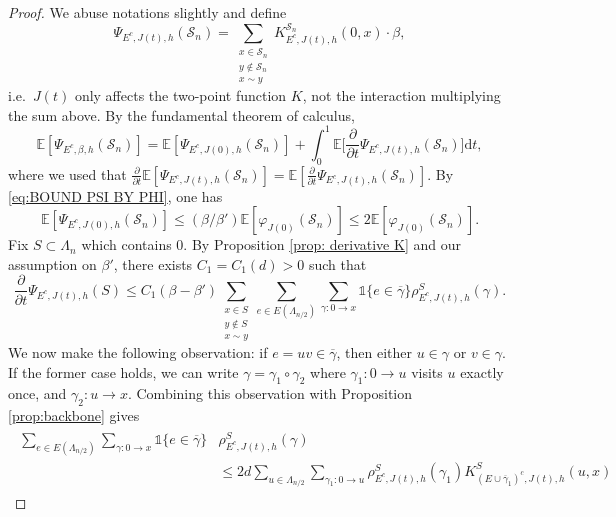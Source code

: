 \documentclass[10pt,a4paper]{amsart}
\numberwithin{equation}{section}
\begin{document}
\begin{proof} We abuse notations slightly and define
\begin{equation}
\Psi_{E^c,J(t),h}(\mathcal S_n)=\sum_{\substack{x\in \mathcal S_n\\y\notin \mathcal S_n\\x\sim y}}K_{E^c,J(t),h}^{\mathcal S_n}(0,x)\cdot \beta,
\end{equation}
i.e.~$J(t)$ only affects the two-point function $K$, not the interaction multiplying the sum above.
By the fundamental theorem of calculus, 
\begin{equation}\label{eq:pf der psi 1}
	\mathbb E[\Psi_{E^c,\beta,h}(\mathcal S_n)]=\mathbb E[\Psi_{E^c,J(0),h}(\mathcal S_n)]+\int_0^1\mathbb E\Big[\frac{\partial}{\partial t}\Psi_{E^c,J(t),h}(\mathcal S_n)\Big]\mathrm{d}t,
\end{equation}
where we used that $\frac{\partial}{\partial t}\mathbb E[\Psi_{E^c,J(t),h}(\mathcal S_n)]=\mathbb E[\frac{\partial}{\partial t}\Psi_{E^c,J(t),h}(\mathcal S_n)]$.
By \eqref{eq:BOUND PSI BY PHI}, one has
\begin{equation}\label{eq:pf der psi 2}
	\mathbb E[\Psi_{E^c,J(0),h}(\mathcal S_n)]\leq (\beta/\beta')\mathbb E[\varphi_{J(0)}(\mathcal S_n)]\leq 2\mathbb E[\varphi_{J(0)}(\mathcal S_n)].
\end{equation}
Fix $S\subset \Lambda_n$ which contains $0$. By Proposition \ref{prop: derivative K} and our assumption on $\beta'$, there exists $C_1=C_1(d)>0$ such that
\begin{equation}\label{eq:pf der psi 3}
	\frac{\partial}{\partial t}\Psi_{E^c,J(t),h}(S)\leq C_1(\beta-\beta')\sum_{\substack{x\in S\\y\notin  S\\ x\sim y}}\sum_{e\in E(\Lambda_{n/2})}\sum_{\gamma:0\rightarrow x}\mathds{1}\{e\in \overline{\gamma}\}\rho_{E^c,J(t),h}^{S}(\gamma).
\end{equation}
We now make the following observation: if $e=uv\in \overline{\gamma}$, then either $u\in \gamma$ or $v\in \gamma$. If the former case holds, we can write $\gamma=\gamma_1\circ\gamma_2$ where $\gamma_1:0\rightarrow u$ visits $u$ exactly once, and $\gamma_2: u\rightarrow x$. Combining this observation with Proposition \ref{prop:backbone} gives
\begin{align}\label{eq:pf der psi 4}
\begin{aligned}
	\sum_{e\in E(\Lambda_{n/2})}\sum_{\gamma:0\rightarrow x}\mathds{1}\{e\in \overline{\gamma}\}&\rho_{E^c,J(t),h}^{S}(\gamma)
	\\&\leq 2d \sum_{u\in \Lambda_{n/2}}\sum_{\gamma_1:0\rightarrow u}\rho_{E^c,J(t),h}^S(\gamma_1)K_{(E\cup\overline{\gamma}_1)^c,J(t),h}^S(u,x)

\end{aligned}
\end{align}
\end{proof}
\end{document}
